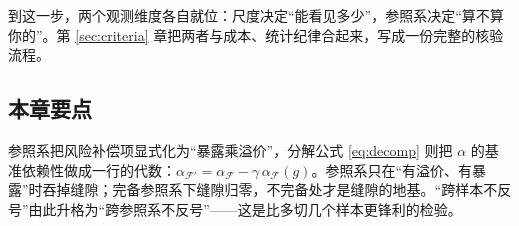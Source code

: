 到这一步，两个观测维度各自就位：尺度决定“能看见多少”，参照系决定“算不算你的”。第 \ref{sec:criteria} 章把两者与成本、统计纪律合起来，写成一份完整的核验流程。

\subsection{本章要点}

参照系把风险补偿项显式化为“暴露乘溢价”，分解公式 \eqref{eq:decomp} 则把 $\alpha$ 的基准依赖性做成一行的代数：$\alpha_{\mathcal{F}'}=\alpha_{\mathcal{F}}-\gamma\,\alpha_{\mathcal{F}}(g)$。参照系只在“有溢价、有暴露”时吞掉缝隙；完备参照系下缝隙归零，不完备处才是缝隙的地基。“跨样本不反号”由此升格为“跨参照系不反号”——这是比多切几个样本更锋利的检验。